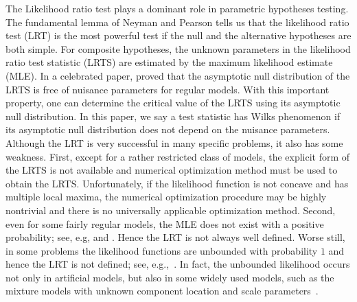 \documentclass[11pt]{article}
\theoremstyle{plain}
\theoremstyle{definition}
\theoremstyle{remark}
\begin{document}
%
The Likelihood ratio test plays a dominant role in parametric hypotheses testing.
The fundamental lemma of Neyman and Pearson tells us that the likelihood ratio test (LRT) is the most powerful test if the null and the alternative hypotheses are both simple.
For composite hypotheses, the unknown parameters in the likelihood ratio test statistic (LRTS) are estimated by the maximum likelihood estimate (MLE).
In a celebrated paper, \citep{Wilks1938The} proved that the asymptotic null distribution of the LRTS is free of nuisance parameters for regular models.
With this important property, one can determine the critical value of the LRTS using its asymptotic null distribution.
In this paper, we say a test statistic has Wilks phenomenon if its asymptotic null distribution does not depend on the nuisance parameters.
Although the LRT is very successful in many specific problems,
it also has some weakness.
First, except for a rather restricted class of models, the explicit form of the LRTS is not available and numerical optimization method must be used to obtain the LRTS.
Unfortunately, if the likelihood function is not concave and has multiple local maxima,
the numerical optimization procedure may be highly nontrivial and there is no universally applicable optimization method.
Second, even for some fairly regular models,
the MLE does not exist with a positive probability; see, e.g, \cite{Fienberg2012} and \cite{Rinaldo2013}.
Hence the LRT is not always well defined.
Worse still, in some problems the likelihood functions are unbounded with probability $1$ and hence the LRT is not defined; see, e.g.,~\cite{Cam1990Maximum}.
In fact, the unbounded likelihood occurs not only in artificial models, but also in some widely used models, such as the mixture models with unknown component location and scale parameters~\citep{chenjiahua2017}.
\end{document}
